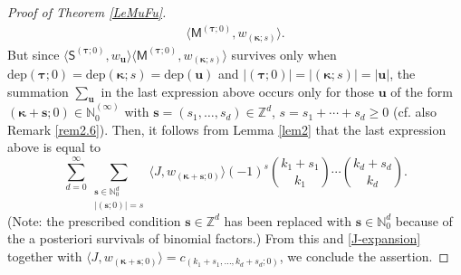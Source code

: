 \documentclass[10pt]{article}
\theoremstyle{definition}
\theoremstyle{remark}
\def\MM{{\mathsf{M}}}
\def\SS{{\mathsf{S}}}
\def\dep{\mathrm{dep}}
\def\bs{{\mathbf{s}}}
\def\bu{{\mathbf{u}}}
\def\bkappa{{\boldsymbol \kappa}}
\def\btau{{\boldsymbol \tau}}
\def\lp{\langle}
\def\rp{\rangle}
\def\N{{\mathbb N}}
\def\Z{{\mathbb Z}}
\def\bkappa{{\boldsymbol \kappa}}
\begin{document}
\begin{proof}[Proof of Theorem \ref{LeMuFu}]
\begin{align*}
\lp \MM^{(\btau;0)}, w_{(\bkappa;s)} \rp .
\end{align*}
But since $\lp\SS^{(\btau;0)},w_\bu\rp \lp \MM^{(\btau;0)}, w_{(\bkappa;s)} \rp$ 
survives only when 
$\dep(\btau;0)=\dep(\bkappa;s)=\dep(\bu)$ and $|(\btau;0)|=|(\bkappa;s)|=|\bu|$,
the summation $\sum_\bu$ in the last expression above occurs only for 
those $\bu$ of the form 
$(\bkappa+\bs;0)\in \N_0^{(\infty)}$ 
with $\bs=(s_1,\dots,s_d)\in\Z^d$, 
$s=s_1+\cdots+s_d\ge 0$
(cf. also Remark \ref{rem2.6}).  
Then, it follows from Lemma \ref{lem2} that the last expression above is equal to 
$$
\sum_{d=0}^\infty \sum_{\substack{\bs\in\N_0^d \\ |(\bs;0)|=s}} 
\lp J, w_{(\bkappa+\bs;0)} \rp
(-1)^s
\binom{k_1+s_1}{k_1}\cdots \binom{k_d+s_d}{k_d}.
$$
(Note: the prescribed condition $\bs\in\Z^d$ has been replaced 
with $\bs\in\N_0^d$ because of the a posteriori survivals of binomial factors.)
From this and \eqref{J-expansion} together with
$\lp J, w_{(\bkappa+\bs;0)} \rp=c_{(k_1+s_1,\dots,k_d+s_d;0)}$, 
we conclude the assertion.
\end{proof}
\end{document}
